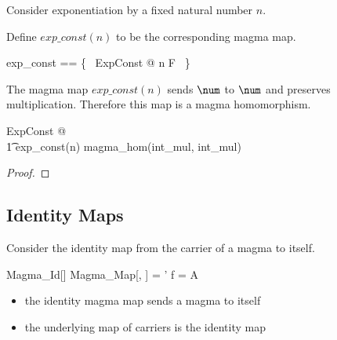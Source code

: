 \documentclass{amsart}
\begin{document}
\begin{example}

Consider exponentiation by a fixed natural number $n$.


Define $exp\_const(n)$ to be the corresponding magma map.

\begin{zed}
	exp\_const == \{~ ExpConst @ n \mapsto F ~\}
\end{zed}

The magma map $exp\_const(n)$ sends $\num$ to $\num$ and preserves multiplication.
Therefore this map is a magma homomorphism.

\begin{zed}
	\forall ExpConst @ \\
	\t1	exp\_const(n) \in magma\_hom(int\_mul, int\_mul)
\end{zed}

\begin{proof}
\end{proof}

\end{example}

\subsection{Identity Maps}

Consider the identity map from the carrier of a magma to itself.

\begin{schema}{Magma\_Id}[\genT]
	Magma\_Map[\genT, \genT]
\where
	\strucA = \strucA'
\also
	f = \id A
\end{schema}

\begin{itemize}
	\item the identity magma map sends a magma to itself
	\item the underlying map of carriers is the identity map
\end{itemize}
\end{document}
